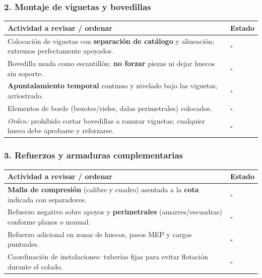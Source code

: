 \documentclass[12pt]{article}
\newcommand{\cbox}{\(\square\)} %
\begin{document}
 \subsubsection*{2. Montaje de viguetas y bovedillas}
 \begin{tabularx}{\linewidth}{>{\raggedright\arraybackslash}p{0.93\linewidth} >{\centering\arraybackslash}m{0.07\linewidth}}
 	\toprule
 	\textbf{Actividad a revisar / ordenar} & \textbf{Estado}\\
 	\midrule
 	Colocación de viguetas con \textbf{separación de catálogo} y alineación; extremos perfectamente apoyados. & \cbox \\
 	Bovedilla usada como escantillón; \textbf{no forzar} piezas ni dejar huecos sin soporte. & \cbox \\
 	\textbf{Apuntalamiento temporal} continuo y nivelado bajo las viguetas, arriostrado. & \cbox \\
 	Elementos de borde (bezotes/rieles, dalas perimetrales) colocados. & \cbox \\
 	\textit{Orden:} prohibido cortar bovedillas o ranurar viguetas; cualquier hueco debe aprobarse y reforzarse. & \cbox \\
 	\bottomrule
 \end{tabularx}
 
 \subsubsection*{3. Refuerzos y armaduras complementarias}
 \begin{tabularx}{\linewidth}{>{\raggedright\arraybackslash}p{0.93\linewidth} >{\centering\arraybackslash}m{0.07\linewidth}}
 	\toprule
 	\textbf{Actividad a revisar / ordenar} & \textbf{Estado}\\
 	\midrule
 	\textbf{Malla de compresión} (calibre y cuadro) asentada a la \textbf{cota} indicada con separadores. & \cbox \\
 	Refuerzo negativo sobre apoyos y \textbf{perimetrales} (amarres/escuadras) conforme planos o manual. & \cbox \\
 	Refuerzo adicional en zonas de huecos, pasos MEP y cargas puntuales. & \cbox \\
 	Coordinación de instalaciones: tuberías fijas para evitar flotación durante el colado. & \cbox \\
 	\bottomrule
 \end{tabularx}
 
\end{document}
